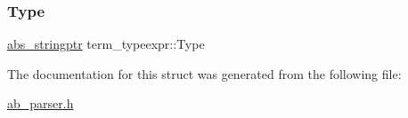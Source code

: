 \mbox{\label{structterm__typeexpr_ae05c0a936f42e129b697dc57ae803e0e}} 
\subsubsection{\texorpdfstring{Type}{Type}}
{\footnotesize\ttfamily \hyperlink{structabs__stringptr}{abs\+\_\+stringptr} term\+\_\+typeexpr\+::\+Type}



The documentation for this struct was generated from the following file\+:\begin{DoxyCompactItemize}
\item 
\hyperlink{ab__parser_8h}{ab\+\_\+parser.\+h}\end{DoxyCompactItemize}
